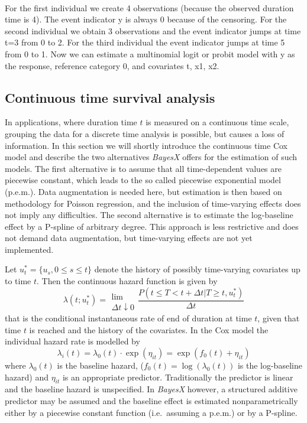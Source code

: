\vspace{0.5cm}\\
For the first individual we create 4 observations (because the
observed duration time is 4). The event indicator y is always 0
because of the censoring. For the second individual we obtain 3
observations and the event indicator jumps at time t=3 from 0 to
2. For the third individual the event indicator jumps at time 5
from 0 to 1. Now we can estimate a multinomial logit or probit
model with y as the response, reference category 0, and covariates
t, x1, x2.


\subsection{Continuous time survival analysis}
\label{continuoustime}

In applications, where duration time $t$ is measured on a
continuous time scale, grouping the data for a discrete time
analysis is possible, but causes a loss of information. In this
section we will shortly introduce the continuous time Cox model
and describe the two alternatives \textit{BayesX} offers for the
estimation of such models. The first alternative is to assume that
all time-dependent values are piecewise constant, which leads to
the so called piecewise exponential model (p.e.m.). Data
augmentation is needed here, but estimation is then based on
methodology for Poisson regression, and the inclusion of
time-varying effects does not imply any difficulties. The second
alternative is to estimate the log-baseline effect by a P-spline
of arbitrary degree. This approach is less restrictive and does
not demand data augmentation, but time-varying effects are not yet
implemented.

Let $u_t^{*}=\{u_s,0 \le s \le t\}$ denote the history of possibly
time-varying covariates up to time $t$. Then the continuous hazard
function is given by
\[
\lambda(t;u_t^{*})=\begin{array}{c}\\\mbox{lim}\\{\Delta t
\downarrow 0}\end{array}\frac{P(t \le T< t+\Delta t | T\ge t,
u_t^{*})}{\Delta t}
\]
that is the conditional instantaneous rate of end of duration at
time $t$, given that time $t$ is reached and the history of the
covariates. In the Cox model the individual hazard rate is
modelled by
\begin{equation}\label{CoxModel}
\lambda_i(t)=\lambda_0(t)\cdot
\exp(\eta_{it})=\exp(f_0(t)+\eta_{it})
\end{equation}
where $\lambda_0(t)$ is the baseline hazard,
($f_0(t)=\log(\lambda_0(t))$ is the log-baseline hazard) and
$\eta_{it}$ is an appropriate predictor. Traditionally the
predictor is linear and the baseline hazard is unspecified. In
\textit{BayesX} however, a structured additive predictor may be
assumed and the baseline effect is estimated nonparametrically
either by a piecewise constant function (i.e.~assuming a p.e.m.)
or by a P-spline.


